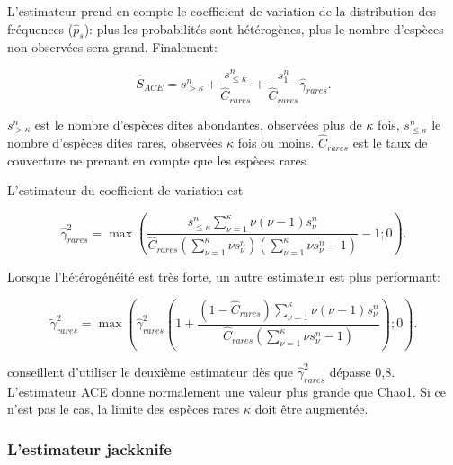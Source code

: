 \documentclass[
  11pt,
  french,
  a4paper,
  extrafontsizes,onecolumn,openright
  ]{memoir}
\newlength{\rf}
\begin{document}
L'estimateur prend en compte le coefficient de variation de la distribution des fréquences (\({\hat{p}}_s\)): plus les probabilités sont hétérogènes, plus le nombre d'espèces non observées sera grand.
Finalement:

\begin{equation}
  \label{eq:ACE}
  \hat{S}_{\mathit{ACE}} = s^{n}_{>\kappa} + \frac{s^{n}_{\le\kappa}}{\hat{C}_\mathit{rares}}+\frac{s^{n}_{1}}{{\hat{C}}_\mathit{rares}}{\hat{\gamma}}_\mathit{rares}.
\end{equation}

\(s^{n}_{>\kappa}\) est le nombre d'espèces dites abondantes, observées plus de \(\kappa\) fois, \(s^{n}_{\le\kappa}\) le nombre d'espèces dites rares, observées \(\kappa\) fois ou moins.
\(\hat{C}_\mathit{rares}\) est le taux de couverture ne prenant en compte que les espèces rares.

L'estimateur du coefficient de variation est

\begin{equation}
  \label{eq:ACEcv}
  \hat{\gamma}^{2}_\mathit{rares} = \max\left(\frac{s^{n}_{\le\kappa}\sum^{\kappa}_{\nu=1}{\nu\left(\nu-1\right){s^{n}_{\nu}}}}{\hat{C}_\mathit{rares}\left(\sum^{\kappa}_{\nu=1}{\nu s^{n}_{\nu}}\right)\left(\sum^{\kappa}_{\nu=1}{\nu s^{n}_{\nu}}-1\right)}-1; 0\right).
\end{equation}

Lorsque l'hétérogénéité est très forte, un autre estimateur est plus performant:

\begin{equation}
  \label{eq:ACEcv2}
  \tilde{\gamma}^{2}_\mathit{rares} = \max\left({\widehat{\gamma}}^2_\mathit{rares}\left(1+\frac{\left(1-{\hat{C}}_\mathit{rares}\right)\sum^{\kappa}_{\nu=1}{\nu\left(\nu -1\right){s^{n}_{\nu}}}}{{\hat{C}}_\mathit{rares}\left(\sum^{\kappa}_{\nu =1}{\nu s^{n}_{\nu}-1}\right)}\right); 0 \right).
\end{equation}

\textcite{Chao2010a} conseillent d'utiliser le deuxième estimateur dès que \({\widehat{\gamma}}^2_\mathit{rares}\) dépasse 0,8.
L'estimateur ACE donne normalement une valeur plus grande que Chao1.
Si ce n'est pas le cas, la limite des espèces rares \(\kappa\) doit être augmentée.

\hypertarget{lestimateur-jackknife}{%
\subsubsection{L'estimateur jackknife}\label{lestimateur-jackknife}}
\end{document}
